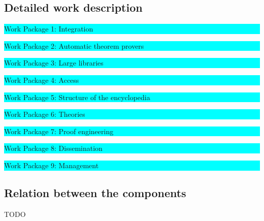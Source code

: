 \subsection{Detailed work description}


\begin{workplan}

\noindent\colorbox{cyan}{\begin{minipage}\textwidth Work Package 1: Integration\end{minipage}}



\noindent\colorbox{cyan}{\begin{minipage}\textwidth Work Package 2: Automatic theorem provers\end{minipage}}



\noindent\colorbox{cyan}{\begin{minipage}\textwidth Work Package 3: Large libraries\end{minipage}}



\noindent\colorbox{cyan}{\begin{minipage}\textwidth Work Package 4: Access\end{minipage}}



\noindent\colorbox{cyan}{\begin{minipage}\textwidth Work Package 5: Structure of the encyclopedia\end{minipage}}



\noindent\colorbox{cyan}{\begin{minipage}\textwidth Work Package 6: Theories\end{minipage}}



\noindent\colorbox{cyan}{\begin{minipage}\textwidth Work Package 7: Proof engineering\end{minipage}}



\noindent\colorbox{cyan}{\begin{minipage}\textwidth Work Package 8: Dissemination\end{minipage}}



\noindent\colorbox{cyan}{\begin{minipage}\textwidth Work Package 9: Management\end{minipage}}



\end{workplan}



\subsection{Relation between the components}


{\color{red} TODO}
